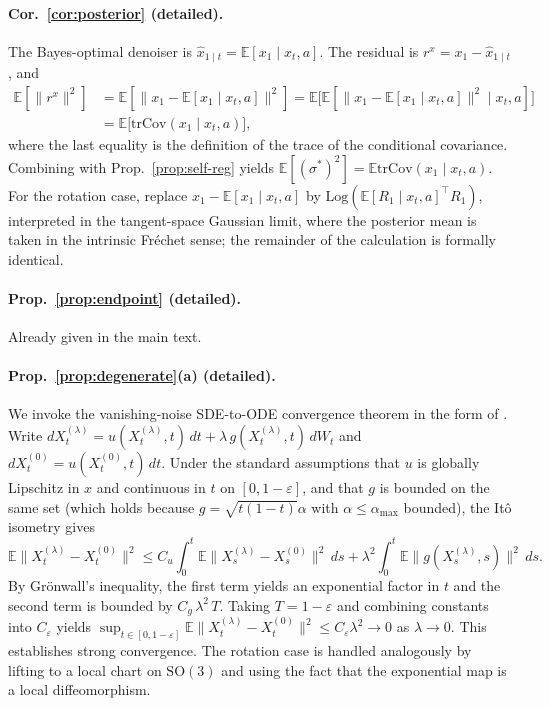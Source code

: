 \documentclass{article}
\theoremstyle{remark}
\theoremstyle{definition}
\newcommand{\E}{\mathbb{E}}
\newcommand{\Cov}{\mathrm{Cov}}
\newcommand{\tr}{\mathrm{tr}}
\newcommand{\SO}{\mathrm{SO}}
\newcommand{\Log}{\mathrm{Log}}
\begin{document}
\paragraph{Cor.~\ref{cor:posterior} (detailed).}
The Bayes-optimal denoiser is
$\hat{x}_{1\mid t}=\E[x_1\mid x_t,a]$. The residual is
$r^x=x_1-\hat{x}_{1\mid t}$, and
\begin{align*}
\E[\|r^x\|^2]
&=\E[\|x_1-\E[x_1\mid x_t,a]\|^2]
=\E\!\big[\E\!\left[\|x_1-\E[x_1\mid x_t,a]\|^2\mid x_t,a\right]\big]\\
&=\E\big[\tr\Cov(x_1\mid x_t,a)\big],
\end{align*}
where the last equality is the definition of the trace of the conditional
covariance. Combining with Prop.~\ref{prop:self-reg} yields
$\E[(\sigma^{\ast})^2]=\E\tr\Cov(x_1\mid x_t,a)$. For the rotation case,
replace $x_1-\E[x_1\mid x_t,a]$ by
$\Log(\E[R_1\mid x_t,a]^\top R_1)$, interpreted in the tangent-space Gaussian
limit, where the posterior mean is taken in the intrinsic Fr\'echet sense; the
remainder of the calculation is formally identical.

\paragraph{Prop.~\ref{prop:endpoint} (detailed).}
Already given in the main text.

\paragraph{Prop.~\ref{prop:degenerate}(a) (detailed).}
We invoke the vanishing-noise SDE-to-ODE convergence theorem in the form of
\citet[Ch.~10, Thm.~2.2]{kloedenplaten1992}. Write
$dX^{(\lambda)}_t=u(X^{(\lambda)}_t,t)\,dt+\lambda\,g(X^{(\lambda)}_t,t)\,dW_t$
and $dX^{(0)}_t=u(X^{(0)}_t,t)\,dt$. Under the standard assumptions that
$u$ is globally Lipschitz in $x$ and continuous in $t$ on
$[0,1-\varepsilon]$, and that $g$ is bounded on the same set (which holds
because $g=\sqrt{t(1-t)}\alpha$ with $\alpha\leq\alpha_{\max}$ bounded), the
It\^o isometry gives
\begin{equation}
\E\|X^{(\lambda)}_t-X^{(0)}_t\|^2
\leq
C_u\int_0^t \E\|X^{(\lambda)}_s-X^{(0)}_s\|^2\,ds
+\lambda^2\int_0^t \E\|g(X^{(\lambda)}_s,s)\|^2\,ds.
\end{equation}
By Gr\"onwall's inequality, the first term yields an exponential factor in $t$
and the second term is bounded by $C_g\,\lambda^2\,T$. Taking $T=1-\varepsilon$
and combining constants into
$C_\varepsilon$ yields
$\sup_{t\in[0,1-\varepsilon]}\E\|X^{(\lambda)}_t-X^{(0)}_t\|^2\leq
C_\varepsilon\lambda^2\to 0$ as $\lambda\to 0$. This establishes strong
convergence. The rotation case is handled analogously by lifting to a local
chart on $\SO(3)$ and using the fact that the exponential map is a local
diffeomorphism.
\end{document}
